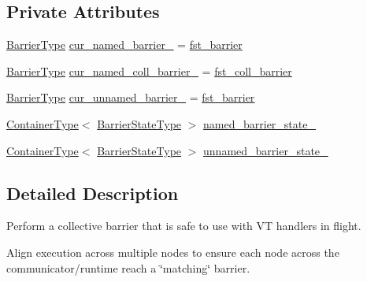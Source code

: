 \subsection*{Private Attributes}
\begin{DoxyCompactItemize}
\item 
\hyperlink{namespacevt_a25e481f0d6bbc7204db23d1c87a62e77}{Barrier\+Type} \hyperlink{structvt_1_1collective_1_1barrier_1_1_barrier_ad3e45365fa6ddf4ca0e08e7f877a580a}{cur\+\_\+named\+\_\+barrier\+\_\+} = \hyperlink{namespacevt_1_1collective_1_1barrier_a43d35d830e81f62b5dfb571ce5e0939e}{fst\+\_\+barrier}
\item 
\hyperlink{namespacevt_a25e481f0d6bbc7204db23d1c87a62e77}{Barrier\+Type} \hyperlink{structvt_1_1collective_1_1barrier_1_1_barrier_a19701ef650907899ae95d750343db5ac}{cur\+\_\+named\+\_\+coll\+\_\+barrier\+\_\+} = \hyperlink{namespacevt_1_1collective_1_1barrier_a02bc7e6a890bd33f1e0b1b264326099c}{fst\+\_\+coll\+\_\+barrier}
\item 
\hyperlink{namespacevt_a25e481f0d6bbc7204db23d1c87a62e77}{Barrier\+Type} \hyperlink{structvt_1_1collective_1_1barrier_1_1_barrier_a320d125e93446c9f39baab502c260a1f}{cur\+\_\+unnamed\+\_\+barrier\+\_\+} = \hyperlink{namespacevt_1_1collective_1_1barrier_a43d35d830e81f62b5dfb571ce5e0939e}{fst\+\_\+barrier}
\item 
\hyperlink{structvt_1_1collective_1_1barrier_1_1_barrier_a84bfbd26a48a1c3bb7272e81245e4873}{Container\+Type}$<$ \hyperlink{structvt_1_1collective_1_1barrier_1_1_barrier_a9b612818f7b44ca65f2caee0dee094f3}{Barrier\+State\+Type} $>$ \hyperlink{structvt_1_1collective_1_1barrier_1_1_barrier_ae5a50600bf815ba049915d93bc48b727}{named\+\_\+barrier\+\_\+state\+\_\+}
\item 
\hyperlink{structvt_1_1collective_1_1barrier_1_1_barrier_a84bfbd26a48a1c3bb7272e81245e4873}{Container\+Type}$<$ \hyperlink{structvt_1_1collective_1_1barrier_1_1_barrier_a9b612818f7b44ca65f2caee0dee094f3}{Barrier\+State\+Type} $>$ \hyperlink{structvt_1_1collective_1_1barrier_1_1_barrier_a83ad5a95d40a7cfcff7782dbc461fb1c}{unnamed\+\_\+barrier\+\_\+state\+\_\+}
\end{DoxyCompactItemize}


\subsection{Detailed Description}
Perform a collective barrier that is safe to use with VT handlers in flight. 

Align execution across multiple nodes to ensure each node across the communicator/runtime reach a \char`\"{}matching\char`\"{} barrier.

